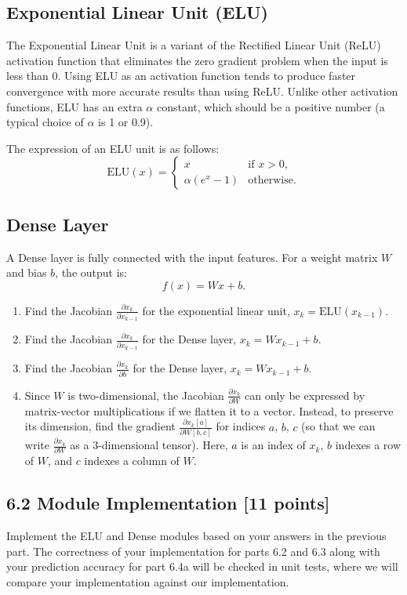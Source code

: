 \documentclass[a3paper,12pt]{extarticle} %
\begin{document}
\subsection*{Exponential Linear Unit (ELU)}
The Exponential Linear Unit is a variant of the Rectified Linear Unit (ReLU) activation function that eliminates the zero gradient problem when the input is less than 0. Using ELU as an activation function tends to produce faster convergence with more accurate results than using ReLU. Unlike other activation functions, ELU has an extra $\alpha$ constant, which should be a positive number (a typical choice of $\alpha$ is 1 or 0.9).

The expression of an ELU unit is as follows:
\[
\text{ELU}(x) = 
\begin{cases} 
x & \text{if } x > 0, \\
\alpha(e^x - 1) & \text{otherwise}.
\end{cases}
\]

\subsection*{Dense Layer}
A Dense layer is fully connected with the input features. For a weight matrix $W$ and bias $b$, the output is:
\[
f(x) = Wx + b.
\]
\begin{enumerate}
    \item 
    Find the Jacobian $\frac{\partial x_k}{\partial x_{k-1}}$ for the exponential linear unit, $x_k = \text{ELU}(x_{k-1})$.
    \item
    Find the Jacobian $\frac{\partial x_k}{\partial x_{k-1}}$ for the Dense layer, $x_k = Wx_{k-1} + b$.
    \item 

    Find the Jacobian $\frac{\partial x_k}{\partial b}$ for the Dense layer, $x_k = Wx_{k-1} + b$.
    \item Since $W$ is two-dimensional, the Jacobian $\frac{\partial x_k}{\partial W}$ can only be expressed by matrix-vector multiplications if we flatten it to a vector. Instead, to preserve its dimension, find the gradient $\frac{\partial x_k[a]}{\partial W[b,c]}$ for indices $a$, $b$, $c$ (so that we can write $\frac{\partial x_k}{\partial W}$ as a 3-dimensional tensor). Here, $a$ is an index of $x_k$, $b$ indexes a row of $W$, and $c$ indexes a column of $W$.
\end{enumerate}

\subsection*{6.2 Module Implementation [11 points]}
Implement the ELU and Dense modules based on your answers in the previous part. The correctness of your implementation for parts 6.2 and 6.3 along with your prediction accuracy for part 6.4a will be checked in unit tests, where we will compare your implementation against our implementation.
\end{document}
